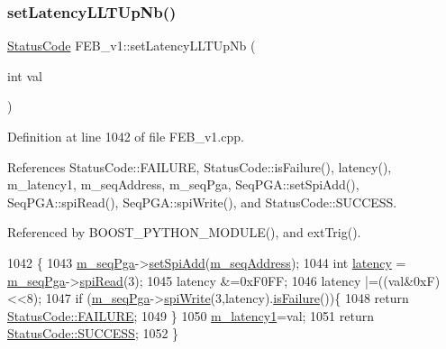 \subsubsection{\texorpdfstring{set\+Latency\+L\+L\+T\+Up\+Nb()}{setLatencyLLTUpNb()}}
{\footnotesize\ttfamily \hyperlink{classStatusCode}{Status\+Code} F\+E\+B\+\_\+v1\+::set\+Latency\+L\+L\+T\+Up\+Nb (\begin{DoxyParamCaption}\item[{int}]{val }\end{DoxyParamCaption})}



Definition at line 1042 of file F\+E\+B\+\_\+v1.\+cpp.



References Status\+Code\+::\+F\+A\+I\+L\+U\+RE, Status\+Code\+::is\+Failure(), latency(), m\+\_\+latency1, m\+\_\+seq\+Address, m\+\_\+seq\+Pga, Seq\+P\+G\+A\+::set\+Spi\+Add(), Seq\+P\+G\+A\+::spi\+Read(), Seq\+P\+G\+A\+::spi\+Write(), and Status\+Code\+::\+S\+U\+C\+C\+E\+SS.



Referenced by B\+O\+O\+S\+T\+\_\+\+P\+Y\+T\+H\+O\+N\+\_\+\+M\+O\+D\+U\+L\+E(), and ext\+Trig().


\begin{DoxyCode}
1042                                            \{
1043   \hyperlink{classFEB__v1_a6c7804ac86796f233a8393043adf2e77}{m\_seqPga}->\hyperlink{classSeqPGA_ac998ce3a6d9b5f2e88cc8393f8c1df53}{setSpiAdd}(\hyperlink{classFEB__v1_a1c1eb093fd1733b9510fcf8bc5c7ad08}{m\_seqAddress});
1044   \textcolor{keywordtype}{int} \hyperlink{classFEB__v1_a68050d232efd8d6568910b09a2c18f62}{latency} = \hyperlink{classFEB__v1_a6c7804ac86796f233a8393043adf2e77}{m\_seqPga}->\hyperlink{classSeqPGA_ab3d0e5e5d4014bc7a92588a76b8713d4}{spiRead}(3);
1045   latency &=0xF0FF;
1046   latency |=((val&0xF)<<8);
1047    \textcolor{keywordflow}{if} (\hyperlink{classFEB__v1_a6c7804ac86796f233a8393043adf2e77}{m\_seqPga}->\hyperlink{classSeqPGA_ad4421841ce4ce8b88ad13f63216f0743}{spiWrite}(3,latency).\hyperlink{classStatusCode_a5dd22dc6eb2c52fc4cabc58f6dea2eb7}{isFailure}())\{
1048     \textcolor{keywordflow}{return} \hyperlink{classStatusCode_a6f565cbeadc76d14c72f047e5e85eb4ba3da73d4c469762eb9d3c960368252b26}{StatusCode::FAILURE};
1049   \}
1050    \hyperlink{classFEB__v1_a026d2f4973bf3ddbc404e35264fdef1f}{m\_latency1}=val;
1051   \textcolor{keywordflow}{return} \hyperlink{classStatusCode_a6f565cbeadc76d14c72f047e5e85eb4badd0da38d3ba0d922efd1f4619bc37ad8}{StatusCode::SUCCESS};   
1052 \}
\end{DoxyCode}
\mbox{\label{classFEB__v1_a5a177c98b2be429aacbb3d652f40b247}} 
